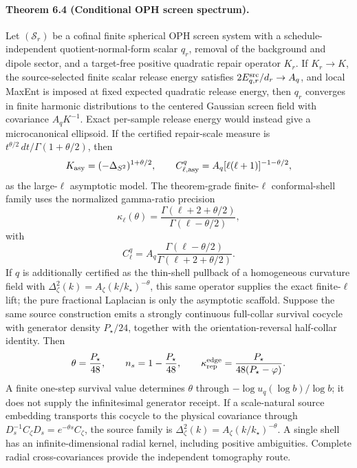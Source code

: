 \paragraph{\textbf{Theorem 6.4 (Conditional OPH screen spectrum).}}
Let \((\mathcal S_r)\) be a cofinal finite spherical OPH screen system with a schedule-independent
quotient-normal-form scalar \(q_r\), removal of the background and dipole sector, and a target-free
positive quadratic repair operator \(K_r\). If \(K_r\to K\), the source-selected finite scalar release energy
satisfies \(2E^{\rm src}_{q,r}/d_r\to A_q\), and local MaxEnt is imposed at fixed expected quadratic release
energy, then \(q_r\) converges in finite harmonic distributions to the centered Gaussian screen
field with covariance \(A_qK^{-1}\). Exact per-sample release energy would instead give a
microcanonical ellipsoid. If the certified repair-scale measure is
\(t^{\theta/2}\,dt/\Gamma(1+\theta/2)\), then
\[
K_{\rm asy}=(-\Delta_{S^2})^{1+\theta/2},
\qquad
C_{\ell,{\rm asy}}^q=A_q[\ell(\ell+1)]^{-1-\theta/2},
\]
as the large-\(\ell\) asymptotic model.  The theorem-grade finite-\(\ell\) conformal-shell family
uses the normalized gamma-ratio precision
\[
\kappa_\ell(\theta)=
\frac{\Gamma(\ell+2+\theta/2)}{\Gamma(\ell-\theta/2)},
\]
with
\[
C_\ell^q=A_q\frac{\Gamma(\ell-\theta/2)}{\Gamma(\ell+2+\theta/2)}.
\]
If \(q\) is additionally certified as the thin-shell pullback of a homogeneous curvature field with
\(\Delta_\zeta^2(k)=A_\zeta(k/k_\star)^{-\theta}\), this same operator supplies the exact
finite-\(\ell\) lift; the pure fractional Laplacian is only the asymptotic scaffold.
Suppose the same source construction emits a strongly continuous full-collar survival cocycle with
generator density \(P_\star/24\), together with the orientation-reversal half-collar identity. Then
\[
\theta=\frac{P_\star}{48},\qquad
n_s=1-\frac{P_\star}{48},\qquad
\kappa_{\rm rep}^{\rm edge}=\frac{P_\star}{48(P_\star-\varphi)}.
\]
A finite one-step survival value determines \(\theta\) through
\(-\log u_q(\log b)/\log b\); it does not supply the infinitesimal generator receipt. If a
scale-natural source embedding transports this cocycle to the physical covariance through
\(D_s^{-1}C_\zeta D_s=e^{-\theta s}C_\zeta\), the source family is
\(\Delta_\zeta^2(k)=A_\zeta(k/k_\star)^{-\theta}\). A single shell has an
infinite-dimensional radial kernel, including positive ambiguities. Complete radial
cross-covariances provide the independent tomography route.

